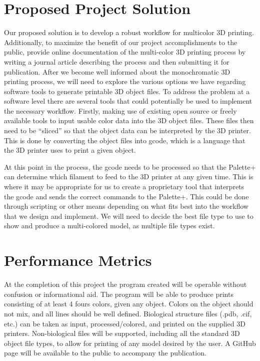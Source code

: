 \documentclass[letterpaper, onecolumn, draftclsnofoot, 10pt, compsoc]{IEEEtran}
\begin{document}
\section{Proposed Project Solution}
    \begin{singlespace}
        Our proposed solution is to develop a robust workflow for multicolor 3D printing. Additionally, to maximize the benefit of our project accomplishments to the public, provide online documentation of the multi-color 3D printing process by writing a journal article describing the process and then submitting it for publication. After we become well informed about the monochromatic 3D printing process, we will need to explore the various options we have regarding software tools to generate printable 3D object files. To address the problem at a software level there are several tools that could potentially be used to implement the necessary workflow. Firstly, making use of existing open source or freely available tools to input usable color data into the 3D object files. These files then need to be “sliced” so that the object data can be interpreted by the 3D printer. This is done by converting the object files into gcode, which is a language that the 3D printer uses to print a given object.\par
        At this point in the process, the gcode needs to be processed so that the Palette+ can determine which filament to feed to the 3D printer at any given time. This is where it may be appropriate for us to create a proprietary tool that interprets the gcode and sends the correct commands to the Palette+. This could be done through scripting or other means depending on what fits best into the workflow that we design and implement. We will need to decide the best file type to use to show and produce a multi-colored model, as multiple file types exist.\par
    \end{singlespace}
    
\section{Performance Metrics}
    \begin{singlespace}
        At the completion of this project the program created will be operable without confusion or informational aid.
        The program will be able to produce prints consisting of at least 4 fours colors, given any object.
        Colors on the object should not mix, and all lines should be well defined.
        Biological structure files (.pdb, .cif, etc.) can be taken as input, processed/colored, and printed on the supplied 3D printers.
        Non-biological files will be supported, including all the standard 3D object file types, to allow for printing of any model desired by the user. A GitHub page will be available to the public to accompany the publication.\par
    \end{singlespace}
\end{document}

